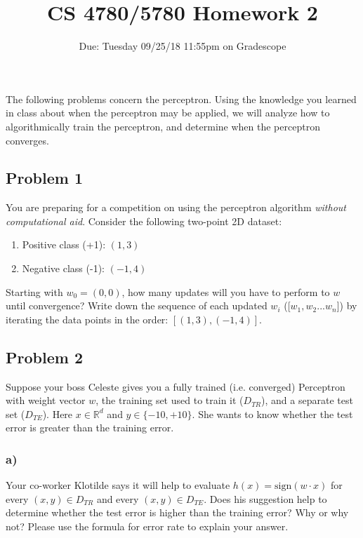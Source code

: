 \documentclass[a4paper]{article}
\title{CS 4780/5780 Homework 2}
\author{Due: Tuesday 09/25/18 11:55pm on Gradescope}
\date{}
\begin{document}
\maketitle

The following problems concern the perceptron. Using the knowledge you learned in class about when the perceptron may be applied, we will analyze how to algorithmically train the perceptron, and determine when the perceptron converges.



\subsection*{Problem 1}
You are preparing for a competition on using the perceptron algorithm \textit{without computational aid}. Consider the following two-point 2D dataset:
\begin{enumerate}
	\item Positive class (+1): $(1, 3)$
	\item Negative class (-1): $(-1, 4)$
\end{enumerate}
Starting with $w_0=(0,0)$, how many updates will you have to perform to $w$ until convergence? Write down the sequence of each updated $w_i$ ([$w_1,w_2...w_n$]) by iterating the data points in the order: $[(1, 3), (-1, 4)]$.

\subsection*{Problem 2}
Suppose your boss Celeste gives you a fully trained (i.e. converged) Perceptron with weight vector $w$, the training set used to train it ($D_{TR}$), and a separate test set ($D_{TE}$). Here $x\in\mathbb{R}^d$ and $y\in\{-10,+10\}$. She wants to know whether the test error is greater than the training error. 

\subsubsection*{a)}
Your co-worker Klotilde says it will help to evaluate $h(x)=\text{sign}(w\cdot x)$ for every $(x,y)\in D_{TR}$ and every $(x,y)\in D_{TE}$. Does his suggestion help to determine whether the test error is higher than the training error? Why or why not? Please use the formula for error rate to explain your answer.
\end{document}
